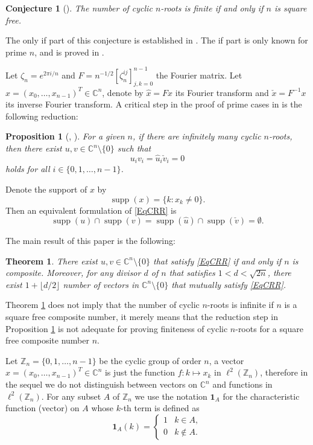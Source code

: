 \documentclass[A4,11pt]{article}
\DeclareMathOperator{\supp}{supp}
\newtheorem{Thm}{Theorem}
\newtheorem{Prop}{Proposition}
\newtheorem{Conj}{Conjecture}
\begin{document}
\begin{Conj}[\cite{bjorck1995}] \label{ConjBS}
The number of cyclic $n$-roots is finite if and only if $n$ is square free.
\end{Conj}

The only if part of this conjecture is established in \cite{bjorck1995}. The if part is only known for prime $n$, and is proved in \cite{haagerup2008}.

Let $\zeta_n=e^{2\pi i/n}$ and $F=n^{-1/2}[\zeta_n^{ij}]_{j,k=0}^{n-1}$ the Fourier matrix. Let $x=(x_0,\ldots,x_{n-1})^T\in\mathbb C^n$, denote by $\hat x=Fx$ its Fourier transform and $\check x=F^{-1}x$ its inverse Fourier transform. A critical step in the proof of prime cases in \cite{haagerup2008} is the following reduction:

\begin{Prop}[{\cite[Lemma 3.4]{haagerup2008}, \cite[Theorem 5.5]{benedetto2019}}] \label{PropCRR}
For a given $n$, if there are infinitely many cyclic $n$-roots, then there exist $u,v\in\mathbb C^n\setminus\{0\}$ such that
\begin{equation} \label{EqCRR}
u_iv_i=\hat u_i\check v_{i}=0
\end{equation}
holds for all $i\in\{0,1,\ldots,n-1\}$. 
\end{Prop}

Denote the support of $x$ by
$$\supp(x)=\{k: x_k\neq 0\}.$$
Then an equivalent formulation of \eqref{EqCRR} is 
\begin{equation} \label{EqCRR2}
\supp(u)\cap\supp(v)=\supp(\hat u)\cap\supp(\check v)=\emptyset.
\end{equation}

The main result of this paper is the following:
\begin{Thm} \label{ThmMain}
There exist $u,v\in\mathbb C^n\setminus\{0\}$ that satisfy \eqref{EqCRR} if and only if $n$ is composite. Moreover, for any divisor $d$ of $n$ that satisfies $1<d<\sqrt{2n}$, there exist $1+\lfloor d/2\rfloor$ number of vectors in $\mathbb C^n\setminus\{0\}$ that mutually satisfy \eqref{EqCRR}.
\end{Thm}

Theorem \ref{ThmMain} does not imply that the number of cyclic $n$-roots is infinite if $n$ is a square free composite number, it merely means that the reduction step in Proposition \ref{PropCRR} is not adequate for proving finiteness of cyclic $n$-roots for a square free composite number $n$.

Let $\mathbb Z_n=\{0,1,\ldots,n-1\}$ be the cyclic group of order $n$, a vector $x=(x_0,\ldots,x_{n-1})^T\in\mathbb C^n$ is just the function $f: k\mapsto x_k$ in $\ell^2(\mathbb Z_n)$, therefore in the sequel we do not distinguish between vectors on $\mathbb C^n$ and functions in $\ell^2(\mathbb Z_n)$. For any subset $A$ of $\mathbb Z_n$ we use the notation $\mathbf 1_A$ for the characteristic function (vector) on $A$ whose $k$-th term is defined as
$$\mathbf 1_A(k)=\begin{cases}1 & k\in A, \\ 0 & k\notin A.\end{cases}$$
\end{document}
